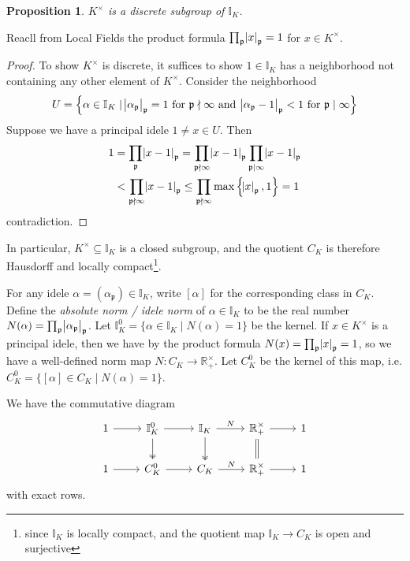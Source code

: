 \documentclass[11pt]{article}
\theoremstyle{definition}
\theoremstyle{plain}
\newtheorem{proposition}[definition]{Proposition}
\theoremstyle{remark}
\newcommand{\II}{\mathbb{I}}
\newcommand{\RR}{\mathbb{R}}
\newcommand{\fp}{\mathfrak{p}}
\begin{document}
\begin{proposition}\label{prop:9_11}
    $K^\times$ is a discrete subgroup of $\II_K$.
\end{proposition}

Reacll from Local Fields the product formula $\prod_{\fp} \abs{x}_\fp = 1$ for $x \in K^\times$.

\begin{proof}
    To show $K^\times$ is discrete, it suffices to show $1 \in \II_K$ has a neighborhood not containing any other element of $K^\times$. Consider the neighborhood
    \begin{equation*}
        U = \left\{\alpha \in \II_K \mid \abs{\alpha_\fp}_\fp = 1 \text{ for } \fp \nmid \infty \text{ and } \abs{\alpha_\fp - 1}_\fp < 1 \text{ for } \fp \mid \infty\right\}
    \end{equation*}
    Suppose we have a principal idele $1 \neq x \in U$. Then
    \begin{align*}
        1
        &= \prod_\fp \abs{x - 1}_\fp
        = \prod_{\fp \nmid \infty} \abs{x - 1}_\fp \prod_{\fp \mid \infty} \abs{x - 1}_\fp\\
        &< \prod_{\fp \nmid \infty} \abs{x-1}_\fp
        \le \prod_{\fp \nmid \infty} \max\left\{\abs{x}_\fp, 1\right\} = 1
    \end{align*}
    contradiction.
\end{proof}

In particular, $K^\times \subseteq \II_K$ is a closed subgroup, and the quotient $C_K$ is therefore Hausdorff and locally compact\footnote{since $\II_K$ is locally compact, and the quotient map $\II_K \to C_K$ is open and surjective}. %

For any idele $\alpha = (\alpha_\fp) \in \II_K$, write $[\alpha]$ for the corresponding class in $C_K$. Define the \emph{absolute norm / idele norm} of $\alpha \in \II_K$ to be the real number $N(\alpha) = \prod_{\fp} \abs{\alpha_\fp}_\fp$. Let $\II_K^0 = \{\alpha \in \II_K \mid N(\alpha) = 1\}$ be the kernel. If $x \in K^\times$ is a principal idele, then we have by the product formula $N(x) = \prod_\fp \abs{x}_\fp = 1$, so we have a well-defined norm map $N : C_K \to \RR^\times_+$. Let $C_K^0$ be the kernel of this map, i.e. $C_K^0 = \{[\alpha] \in C_K \mid N(\alpha) = 1\}$.

{\color{blue}
    We have the commutative diagram
    \begin{equation*}
        \begin{tikzcd}
            1 \arrow[r] & \II_K^0 \arrow[r] \arrow[d, twoheadrightarrow] & \II_K \arrow[r, "N"] \arrow[d, twoheadrightarrow] & \RR_+^\times \arrow[r] \arrow[d, equal] & 1\\
            1 \arrow[r] & C_K^0 \arrow[r] & C_K \arrow[r, "N"] & \RR_+^\times \arrow[r] & 1
        \end{tikzcd}
    \end{equation*}
    with exact rows.
}
\end{document}
